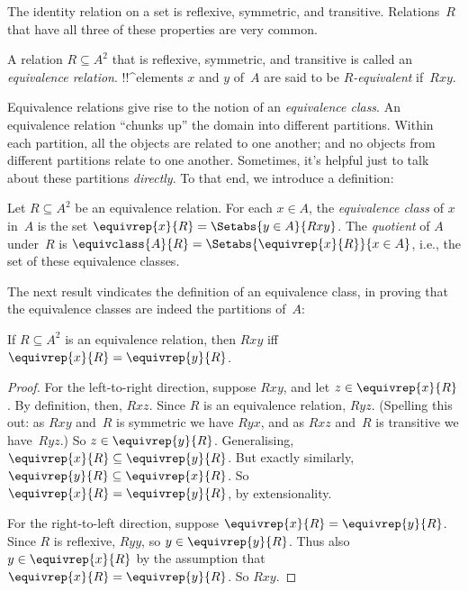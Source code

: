 \documentclass[../../../include/open-logic-section]{subfiles}
\begin{document}


The identity relation on a set is reflexive, symmetric, and
transitive. Relations~$R$ that have all three of these properties are very
common.

\begin{defn} 
A relation $R \subseteq A^2$ that is reflexive, symmetric, and
transitive is called an \emph{equivalence relation}. !!^{element}s $x$
and $y$ of~$A$ are said to be \emph{$R$-equivalent} if~$Rxy$.
\end{defn}

Equivalence relations give rise to the notion of an \emph{equivalence
class}. An equivalence relation ``chunks up'' the domain into
different partitions. Within each partition, all the objects are
related to one another; and no objects from different partitions
relate to one another. Sometimes, it's helpful just to talk about
these partitions \emph{directly}. To that end, we introduce a
definition:

\begin{defn}
Let $R \subseteq A^2$ be an equivalence relation. For each $x \in A$,
the \emph{equivalence class} of $x$ in~$A$ is the set $\equivrep{x}{R}
= \Setabs{y \in A}{Rxy}$. The \emph{quotient} of $A$ under~$R$ is
$\equivclass{A}{R} = \Setabs{\equivrep{x}{R}}{x \in A}$, i.e., the set
of these equivalence classes. 
\end{defn}

The next result vindicates the definition of an equivalence class, in
proving that the equivalence classes are indeed the partitions of~$A$:

\begin{prop}
If $R \subseteq A^2$ is an equivalence relation, then $Rxy$ iff
$\equivrep{x}{R} = \equivrep{y}{R}$.
\end{prop}

\begin{proof}
For the left-to-right direction, suppose $Rxy$, and let $z \in
\equivrep{x}{R}$. By definition, then, $Rxz$. Since $R$ is an
equivalence relation, $Ryz$. (Spelling this out: as $Rxy$ and~$R$ is
symmetric we have $Ryx$, and as $Rxz$ and~$R$ is transitive we
have~$Ryz$.) So $z \in \equivrep{y}{R}$. Generalising,
$\equivrep{x}{R} \subseteq \equivrep{y}{R}$. But exactly similarly,
$\equivrep{y}{R} \subseteq \equivrep{x}{R}$. So $\equivrep{x}{R} =
\equivrep{y}{R}$, by extensionality.

For the right-to-left direction, suppose $\equivrep{x}{R} =
\equivrep{y}{R}$. Since $R$ is reflexive, $Ryy$, so $y \in
\equivrep{y}{R}$. Thus also $y \in \equivrep{x}{R}$ by the assumption
that $\equivrep{x}{R} = \equivrep{y}{R}$. So $Rxy$.
\end{proof}
\end{document}
